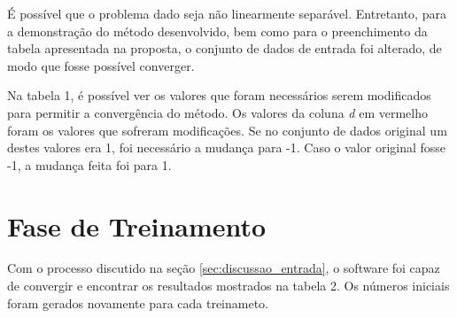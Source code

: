 \documentclass{article}
\begin{document}
\par É possível que o problema dado seja não linearmente separável. Entretanto, para a demonstração do método desenvolvido, bem como para o preenchimento da tabela apresentada na proposta, o conjunto de dados de entrada foi alterado, de modo que fosse possível converger.

\par Na tabela 1, é possível ver os valores que foram necessários serem modificados para permitir a convergência do método. Os valores da coluna \emph{d} em vermelho foram os valores que sofreram modificações. Se no conjunto de dados original um destes valores era 1, foi necessário a mudança para -1. Caso o valor original fosse -1, a mudança feita foi para 1.





\section{Fase de Treinamento}
\label{sec:fase_treinamento}
\par Com o processo discutido na seção \ref{sec:discussao_entrada}, o software foi capaz de convergir e encontrar os resultados mostrados na tabela 2. Os números iniciais foram gerados novamente para cada treinameto.
\end{document}
